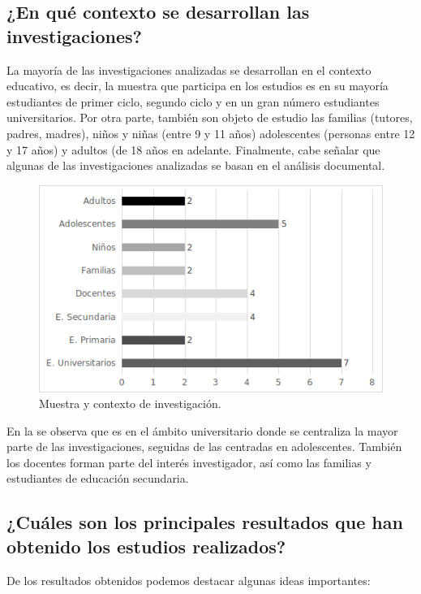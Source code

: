 \documentclass[spanish]{textolivre}
\begin{document}
\subsection{¿En qué contexto se desarrollan las investigaciones?}\label{sec-organizacao-latex}
La mayoría de las investigaciones analizadas se desarrollan en el contexto educativo, es decir, la muestra que participa en los estudios es en su mayoría estudiantes de primer ciclo, segundo ciclo y en un gran número estudiantes universitarios. Por otra parte, también son objeto de estudio las familias (tutores, padres, madres), niños y niñas (entre 9 y 11 años) adolescentes (personas entre 12 y 17 años) y adultos (de 18 años en adelante. Finalmente, cabe señalar que algunas de las investigaciones analizadas se basan en el análisis documental.

\begin{figure}[h!]
\centering
\begin{minipage}{0.75\textwidth}
\includegraphics[width=\textwidth]{Fig7.png}
\caption{Muestra y contexto de investigación.}
\label{fig7}
\end{minipage}
\end{figure}

En la  se observa que es en el ámbito universitario donde se centraliza la mayor parte de las investigaciones, seguidas de las centradas en adolescentes. También los docentes forman parte del interés investigador, así como las familias y estudiantes de educación secundaria.

\subsection{¿Cuáles son los principales resultados que han obtenido los estudios realizados?}\label{sec-titulo}
De los resultados obtenidos podemos destacar algunas ideas importantes:
\end{document}
